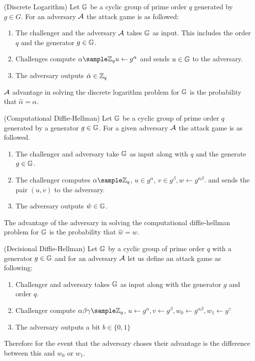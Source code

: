 \begin{attackGame} (Discrete Logarithm)
 Let \(\mathbb{G}\) be a cyclic group of prime order \(q\) generated by \(g \in G\). For an adversary \(\mathcal{A}\) the attack game is as followed: 
 \begin{enumerate}
    \item The challenger and the adversary \(\mathcal{A}\) takes \(\mathbb{G}\) as input. This includes the order \(q\) and the generator \(g \in \mathbb{G}\). 
    \item Challenges compute \(\alpha  \sample \Z_q u \gets g^\alpha \) and sends \(u \in \mathbb{G}\) to the adversary. 
    \item The adversary outputs \(\hat{\alpha } \in \mathbb{Z}_q\)         
 \end{enumerate}
 \(\mathcal{A}\) advantage in solving the discrete logarithm problem for \(\mathbb{G}\) is the probability that \(\hat{\alpha } = \alpha \).      
\end{attackGame}

\begin{attackGame} (Computational Diffie-Hellman)
    Let \(\mathbb{G}\) be a cyclic group of prime order \(q\) generated by a generator \(g \in \mathbb{G}\). For a given adversary \(\mathcal{A}\) the attack game is as followed. 
    \begin{enumerate}
        \item  The challenger and adversary take \(\mathbb{G}\) as input along with \(q\) and the generate \(g \in \mathbb{G}\). 
        \item The challenger computes \(\alpha  \sample \Z_q\), \(u \in g^\alpha \), \(v \in g^\beta , w \gets g^{\alpha \beta }\). 
        and sends the pair \((u,v)\) to the adversary. 
        \item The adversary outputs \(\hat{w} \in \mathbb{G}\).         
    \end{enumerate}
    The advantage of the adversary in solving the computational diffie-hellman problem for \(\mathbb{G}\) is the probability that \(\hat{w} = w\).  
\end{attackGame}

\begin{attackGame} (Decisional Diffie-Hellman)
    Let \(\mathbb{G}\) by a cyclic group of prime order \(q\) with a generator \(g \in \mathbb{G}\) and for an adversary \(\mathcal{A}\) let us define an attack game as following: 
    \begin{enumerate}
        \item Challenger and adversary takes \(\mathbb{G}\) as input along with the generator \(g\) and order \(q\). 
        \item Challenger compute \(\alpha \beta \gamma \sample \Z_q\), \(u \gets g^\alpha , v \gets g^\beta , w_0 \gets g^{\alpha \beta }, w_1 \gets g^\gamma  \)     
        \item The adversary outputs a bit \(b \in \{0,1\}\) 
    \end{enumerate}
    Therefore for the event that the adversary choses their advantage is the difference between this and \(w_0\) or \(w_1\).  
\end{attackGame}

